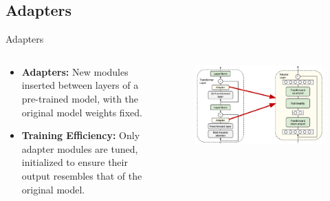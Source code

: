 \documentclass[serif, aspectratio=169]{beamer}
\begin{document}
\subsection{Adapters}
\begin{frame}{Adapters}
    \begin{columns} %

        \begin{column}{0.5\textwidth}
            \begin{itemize}
                \item  
                    \textbf{Adapters: }
                     New modules inserted between layers of a pre-trained model, with the original model weights fixed.
                    \vspace{0.3cm}
                \item  
                    \textbf{Training Efficiency: }
                      Only adapter modules are tuned, initialized to ensure their output resembles that of the original model.
                    \vspace{0.3cm}
            \end{itemize}
        \end{column}

        \begin{column}{0.5\textwidth}
            \begin{figure}
                \centering
                \includegraphics[width=1.04\textwidth]{pic/Adaptor.PNG}
            \end{figure}
        \end{column}

    \end{columns}
\end{frame}
\end{document}
